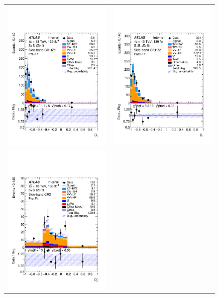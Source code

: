 \begin{figure}[htbp]
	\centering
	\begin{tabular}{cc}
		\includegraphics[width=.45\textwidth]{Appendices/AP9/figures/SPLUSB_CRSR_UsingBaseFullSys/Plots/SBCR1} &
		\includegraphics[width=.45\textwidth]{Appendices/AP9/figures/SPLUSB_CRSR_UsingBaseFullSys/Plots/SBCR1_postFit} \\
		\includegraphics[width=.45\textwidth]{Appendices/AP9/figures/SPLUSB_CRSR_UsingBaseFullSys/Plots/SBCR2} &

\end{tabular}
\end{figure}
